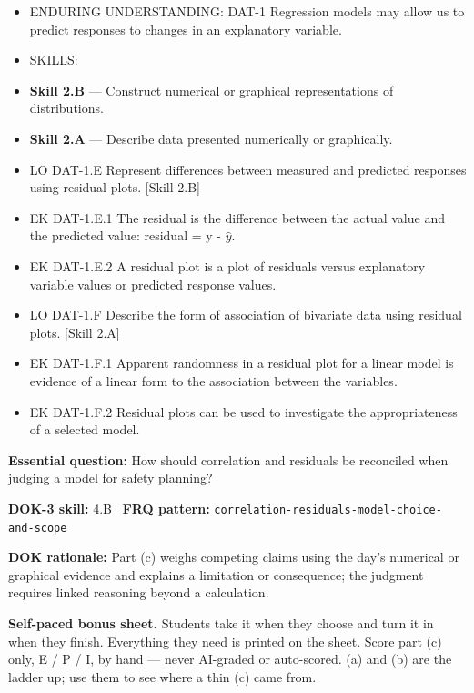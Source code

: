 \documentclass[11pt]{article}
\begin{document}


{\small
\begin{itemize}[leftmargin=1.5em,itemsep=2pt,topsep=2pt]
  \item ENDURING UNDERSTANDING: DAT-1 Regression models may allow us to predict responses to changes in an explanatory variable.
  \item SKILLS:
  \item \textbf{Skill 2.B} --- Construct numerical or graphical representations of distributions.
  \item \textbf{Skill 2.A} --- Describe data presented numerically or graphically.
  \item LO DAT-1.E Represent differences between measured and predicted responses using residual plots. [Skill 2.B]
  \item EK DAT-1.E.1 The residual is the difference between the actual value and the predicted value: residual = y - $\widehat{y}$.
  \item EK DAT-1.E.2 A residual plot is a plot of residuals versus explanatory variable values or predicted response values.
  \item LO DAT-1.F Describe the form of association of bivariate data using residual plots. [Skill 2.A]
  \item EK DAT-1.F.1 Apparent randomness in a residual plot for a linear model is evidence of a linear form to the association between the variables.
  \item EK DAT-1.F.2 Residual plots can be used to investigate the appropriateness of a selected model.
\end{itemize}
}
\textbf{Essential question:} How should correlation and residuals be reconciled when judging a model for safety planning?\par
\textbf{DOK-3 skill:} 4.B \textperiodcentered\ \textbf{FRQ pattern:} {\small\texttt{correlation-\allowbreak{}residuals-\allowbreak{}model-\allowbreak{}choice-\allowbreak{}and-\allowbreak{}scope}}\par
\textbf{DOK rationale:} Part (c) weighs competing claims using the day's numerical or graphical evidence and explains a limitation or consequence; the judgment requires linked reasoning beyond a calculation.\par

\textbf{Self-paced bonus sheet.} Students take it when they choose and turn it in when they finish. Everything they need is printed on the sheet. Score part (c) only, E / P / I, by hand --- never AI-graded or auto-scored. (a) and (b) are the ladder up; use them to see where a thin (c) came from.\par
\end{document}

